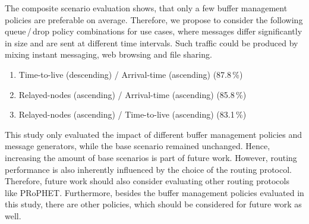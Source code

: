 \documentclass[conference,10pt,letterpaper,final]{IEEEtran}
\begin{document}
The composite scenario evaluation shows, that only a few buffer management policies are preferable on average.
Therefore, we propose to consider the following queue\,/\,drop policy combinations for use cases, where messages differ significantly in size and are sent at different time intervals.
Such traffic could be produced by mixing instant messaging, web browsing and file sharing.


\begin{enumerate}
\item Time-to-live (descending) / Arrival-time (ascending) (87.8\,\%)
\vspace{0.1cm}
\item Relayed-nodes (ascending) / Arrival-time (ascending) (85.8\,\%)
\vspace{0.1cm}
\item Relayed-nodes (ascending) / Time-to-live (ascending) (83.1\,\%)
\vspace{0.1cm}
\end{enumerate}

This study only evaluated the impact of different buffer management policies and message generators, while the base scenario remained unchanged.
Hence, increasing the amount of base scenarios is part of future work.
However, routing performance is also inherently influenced by the choice of the routing protocol.
Therefore, future work should also consider evaluating other routing protocols like PRoPHET.
Furthermore, besides the buffer management policies evaluated in this study, there are other policies, which should be considered for future work as well.
\end{document}
